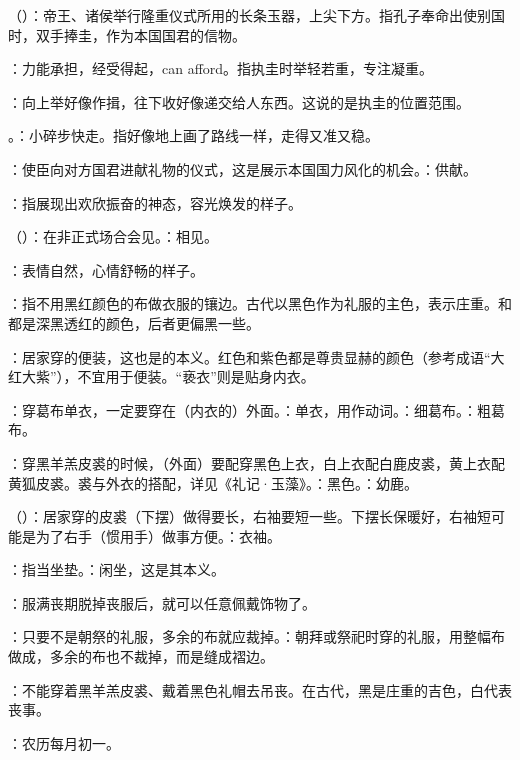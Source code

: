 {
\item {}（）：帝王、诸侯举行隆重仪式所用的长条玉器，上尖下方。指孔子奉命出使别国时，双手捧圭，作为本国国君的信物。
\item {}：力能承担，经受得起，can afford。指执圭时举轻若重，专注凝重。
\item {}：向上举好像作揖，往下收好像递交给人东西。这说的是执圭的位置范围。
\item {}。：小碎步快走。指好像地上画了路线一样，走得又准又稳。
\item {}：使臣向对方国君进献礼物的仪式，这是展示本国国力风化的机会。：供献。
\item {}：指展现出欢欣振奋的神态，容光焕发的样子。
\item {}（）：在非正式场合会见。：相见。
\item {}：表情自然，心情舒畅的样子。
}
{}


{
\item {}：指不用黑红颜色的布做衣服的镶边。古代以黑色作为礼服的主色，表示庄重。和都是深黑透红的颜色，后者更偏黑一些。
\item {}：居家穿的便装，这也是的本义。红色和紫色都是尊贵显赫的颜色（参考成语“大红大紫”），不宜用于便装。“亵衣”则是贴身内衣。
\item {}：穿葛布单衣，一定要穿在（内衣的）外面。：单衣，用作动词。：细葛布。：粗葛布。
\item {}：穿黑羊羔皮裘的时候，（外面）要配穿黑色上衣，白上衣配白鹿皮裘，黄上衣配黄狐皮裘。裘与外衣的搭配，详见《礼记·玉藻》。：黑色。：幼鹿。
\item {}（）：居家穿的皮裘（下摆）做得要长，右袖要短一些。下摆长保暖好，右袖短可能是为了右手（惯用手）做事方便。：衣袖。
\item {}：指当坐垫。：闲坐，这是其本义。
\item {}：服满丧期脱掉丧服后，就可以任意佩戴饰物了。
\item {}：只要不是朝祭的礼服，多余的布就应裁掉。：朝拜或祭祀时穿的礼服，用整幅布做成，多余的布也不裁掉，而是缝成褶边。
\item {}：不能穿着黑羊羔皮裘、戴着黑色礼帽去吊丧。在古代，黑是庄重的吉色，白代表丧事。
\item {}：农历每月初一。
}
{}


